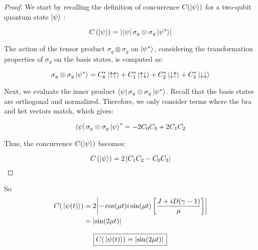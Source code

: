\begin{proof}
	We start by recalling the definition of concurrence $C(\ket{\psi})$ for a two-qubit quantum state $\ket{\psi}$ 
	\cite{wootters_entanglement_1998}:

\begin{equation}
	C\left( \ket{\psi} \right)  = \left|  \bra{\psi} \sigma_y \otimes \sigma_y \ket{\psi^*} \right| 
\end{equation} 



The action of the tensor product $\sigma_y \otimes \sigma_y$ on $\ket{\psi^*}$, considering the transformation properties of $\sigma_y$ on the basis states, is computed as:



\begin{equation}
	\sigma_y \otimes \sigma_y \ket{\psi^*}= C_0^* \ket{\uparrow \uparrow}  + C_1^* \ket{\uparrow \downarrow} + C_2^* \ket{\downarrow \uparrow}  +  C_3^*\ket{\downarrow \downarrow}  
\end{equation}

Next, we evaluate the inner product $\bra{\psi} \sigma_y \otimes \sigma_y \ket{\psi^*}$. Recall that the basis states are orthogonal and normalized. Therefore, we only consider terms where the bra and ket vectors match, which gives:





\begin{equation}
	\bra{\psi} \sigma_y \otimes \sigma_y \ket{\psi}^* = -2C_0C_3 + 2C_1C_2
\end{equation}

Thus, the concurrence $C(\ket{\psi})$ becomes:


\begin{equation*}
	C\left( \ket{\psi} \right)  = 2 \left|  C_1C_2 -C_0C_3 \right| 
\end{equation*}
\end{proof}

So 
\begin{align*}
	C(\ket*{\psi(t)}) &= 2\abs{ -\cos(\mu t)	
	i\sin(\mu t) \left[ \frac{J 
	+i D (\gamma -1)}{\mu}  \right]  } \\
	&= \abs*{\sin(2\mu t)}
\end{align*}

\begin{equation*}
	\boxed{C(\ket*{\psi(t)}) = \abs*{\sin(2 \mu t)}}
\end{equation*}
